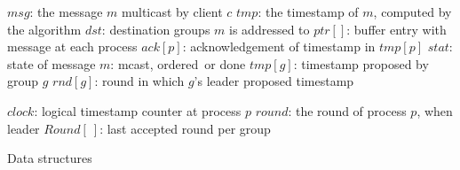 
\newcommand{\rdwrite}[3]{WRITE\ensuremath{(@#1\!\rightarrow\!#2, #3)}}	%
\newcommand{\band}{\textbf{and}}
\newcommand{\mcast}{\textsf{mcast}}
\newcommand{\ack}{\textsf{ack}}
\newcommand{\ordered}{\textsf{ordered}}
\newcommand{\done}{\textsf{done}}
\newcommand{\myack}{\textsf{ack}}

\begin{algorithm}
\footnotesize

\begin{distribalgo}[1]

\vspace{1.0mm}
	\STATE $msg$: the message $m$ multicast by client $c$
	\STATE $tmp$: the timestamp of $m$, computed by the algorithm
	\STATE $dst$: destination groups $m$ is addressed to
	\STATE $ptr[]$: buffer entry with message at each process
	\STATE $ack[p]$: acknowledgement of timestamp in $tmp[p]$
	\STATE $stat$: state of message $m$: \mcast, \ordered\ or \done
\ENDINDENT
\vspace{1.0mm}
	\STATE $tmp[g]$: timestamp proposed by group $g$
	\STATE $rnd[g]$: round in which $g$'s leader proposed timestamp
\ENDINDENT
\vspace{1.0mm}
\vspace{1.0mm}

	\STATE $clock$: logical timestamp counter at process $p$
	\STATE $round$: the round of process $p$, when leader
	\STATE $Round[\ ]$: last accepted round per group
\ENDINDENT
\vspace{1.0mm}
\caption{Data structures}
\label{alg:data_struct}
\end{distribalgo}
\end{algorithm}

